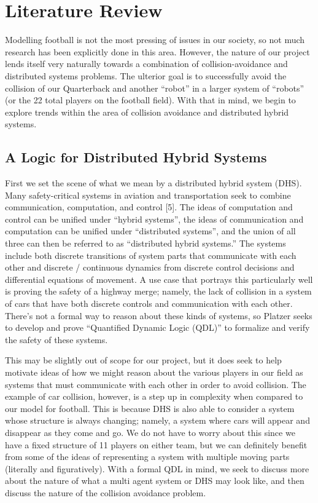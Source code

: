 

\section{Literature Review}

\quad Modelling football is not the most pressing of issues in our society, so not much research has been explicitly done in this area. However, the nature of our project lends itself very naturally towards a combination of collision-avoidance and distributed systems problems. The ulterior goal is to successfully avoid the collision of our Quarterback and another “robot” in a larger system of “robots” (or the 22 total players on the football field). With that in mind, we begin to explore trends within the area of collision avoidance and distributed hybrid systems. 

\subsection{A Logic for Distributed Hybrid Systems}
\quad First we set the scene of what we mean by a distributed hybrid system (DHS). Many safety-critical systems in aviation and transportation seek to combine communication, computation, and control [5]. The ideas of computation and control can be unified under “hybrid systems”, the ideas of communication and computation can be unified under “distributed systems”, and the union of all three can then be referred to as “distributed hybrid systems.” The systems include both discrete transitions of system parts that communicate with each other and discrete / continuous dynamics from discrete control decisions and differential equations of movement. A use case that portrays this particularly well is proving the safety of a highway merge; namely, the lack of collision in a system of cars that have both discrete controls and communication with each other. There’s not a formal way to reason about these kinds of systems, so Platzer seeks to develop and prove “Quantified Dynamic Logic (QDL)” to formalize and verify the safety of these systems. 

This may be slightly out of scope for our project, but it does seek to help motivate ideas of how we might reason about the various players in our field as systems that must communicate with each other in order to avoid collision. The example of car collision, however, is a step up in complexity when compared to our model for football. This is because DHS is also able to consider a system whose structure is always changing; namely, a system where cars will appear and disappear as they come and go. We do not have to worry about this since we have a fixed structure of 11 players on either team, but we can definitely benefit from some of the ideas of representing a system with multiple moving parts (literally and figuratively). With a formal QDL in mind, we seek to discuss more about the nature of what a multi agent system or DHS may look like, and then discuss the nature of the collision avoidance problem. 

